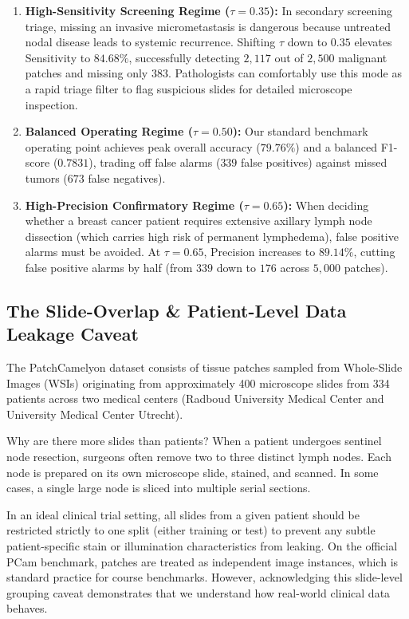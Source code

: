 \documentclass[11pt,a4paper]{article}
\begin{document}
\begin{enumerate}[leftmargin=*]
    \item \textbf{High-Sensitivity Screening Regime ($\tau = 0.35$):}
    In secondary screening triage, missing an invasive micrometastasis is dangerous because untreated nodal disease leads to systemic recurrence. Shifting $\tau$ down to $0.35$ elevates Sensitivity to \textbf{$84.68\%$}, successfully detecting $2,117$ out of $2,500$ malignant patches and missing only $383$. Pathologists can comfortably use this mode as a rapid triage filter to flag suspicious slides for detailed microscope inspection.
    
    \item \textbf{Balanced Operating Regime ($\tau = 0.50$):}
    Our standard benchmark operating point achieves peak overall accuracy ($79.76\%$) and a balanced F1-score ($0.7831$), trading off false alarms ($339$ false positives) against missed tumors ($673$ false negatives).
    
    \item \textbf{High-Precision Confirmatory Regime ($\tau = 0.65$):}
    When deciding whether a breast cancer patient requires extensive axillary lymph node dissection (which carries high risk of permanent lymphedema), false positive alarms must be avoided. At $\tau = 0.65$, Precision increases to \textbf{$89.14\%$}, cutting false positive alarms by half (from $339$ down to $176$ across $5,000$ patches).
\end{enumerate}

\subsection{The Slide-Overlap \& Patient-Level Data Leakage Caveat}
The PatchCamelyon dataset consists of tissue patches sampled from Whole-Slide Images (WSIs) originating from approximately 400 microscope slides from 334 patients across two medical centers (Radboud University Medical Center and University Medical Center Utrecht).

Why are there more slides than patients? When a patient undergoes sentinel node resection, surgeons often remove two to three distinct lymph nodes. Each node is prepared on its own microscope slide, stained, and scanned. In some cases, a single large node is sliced into multiple serial sections.

In an ideal clinical trial setting, all slides from a given patient should be restricted strictly to one split (either training or test) to prevent any subtle patient-specific stain or illumination characteristics from leaking. On the official PCam benchmark, patches are treated as independent image instances, which is standard practice for course benchmarks. However, acknowledging this slide-level grouping caveat demonstrates that we understand how real-world clinical data behaves.
\end{document}
